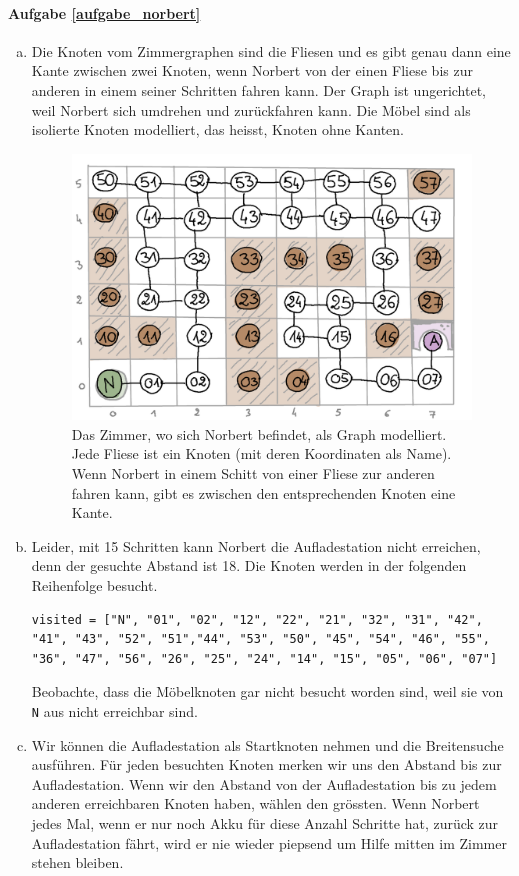 \paragraph{Aufgabe \ref{aufgabe_norbert}}
\begin{enumerate}[(a)]
\item Die Knoten vom Zimmergraphen sind die Fliesen und es gibt genau dann eine Kante zwischen zwei Knoten, wenn Norbert von der einen Fliese bis zur anderen in einem seiner Schritten fahren kann. Der Graph ist ungerichtet, weil Norbert sich umdrehen und zurückfahren kann. Die Möbel sind als isolierte Knoten modelliert, das heisst, Knoten ohne Kanten.

\begin{figure}[H]
    \centering
    \includegraphics[width=\textwidth]{Pictures/SP/norbert_graph.png}
    \caption{Das Zimmer, wo sich Norbert befindet, als Graph modelliert. Jede Fliese ist ein Knoten (mit deren Koordinaten als Name). Wenn Norbert in einem Schitt von einer Fliese zur anderen fahren kann, gibt es zwischen den entsprechenden Knoten eine Kante.}
    \label{fig:norbert_graph}
\end{figure}
\item Leider, mit 15 Schritten kann Norbert die Aufladestation nicht erreichen, denn der gesuchte Abstand ist 18. Die Knoten werden in der folgenden Reihenfolge besucht.
\begin{lstlisting}
visited = ["N", "01", "02", "12", "22", "21", "32", "31", "42", "41", "43", "52", "51","44", "53", "50", "45", "54", "46", "55", "36", "47", "56", "26", "25", "24", "14", "15", "05", "06", "07"]
\end{lstlisting}
Beobachte, dass die Möbelknoten gar nicht besucht worden sind, weil sie von \texttt{N} aus nicht erreichbar sind.
\item Wir können die Aufladestation als Startknoten nehmen und die Breitensuche ausführen. Für jeden besuchten Knoten merken wir uns den Abstand bis zur Aufladestation. Wenn wir den Abstand von der Aufladestation bis zu jedem anderen erreichbaren Knoten haben, wählen den grössten. Wenn Norbert jedes Mal, wenn er nur noch Akku für diese Anzahl Schritte hat, zurück zur Aufladestation fährt, wird er nie wieder piepsend um Hilfe mitten im Zimmer stehen bleiben.


\end{enumerate}
